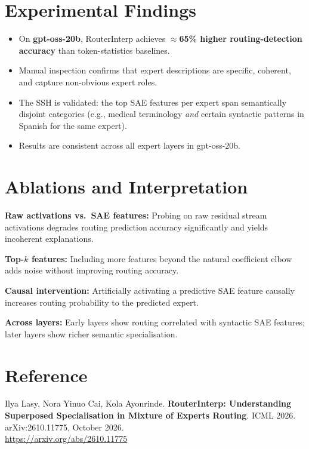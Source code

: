 \documentclass[10pt,twocolumn]{article}
\begin{document}
\section{Experimental Findings}

\begin{itemize}[itemsep=2pt,parsep=0pt]
  \item On \textbf{gpt-oss-20b}, RouterInterp achieves $\approx$\textbf{65\%
    higher routing-detection accuracy} than token-statistics baselines.
  \item Manual inspection confirms that expert descriptions are specific,
    coherent, and capture non-obvious expert roles.
  \item The SSH is validated: the top SAE features per expert span
    semantically disjoint categories (e.g., medical terminology
    \emph{and} certain syntactic patterns in Spanish for the same expert).
  \item Results are consistent across all expert layers in gpt-oss-20b.
\end{itemize}

\section{Ablations and Interpretation}

\textbf{Raw activations vs.\ SAE features:} Probing on raw residual stream
activations degrades routing prediction accuracy significantly and yields
incoherent explanations.

\textbf{Top-$k$ features:} Including more features beyond the natural
coefficient elbow adds noise without improving routing accuracy.

\textbf{Causal intervention:} Artificially activating a predictive SAE feature
causally increases routing probability to the predicted expert.

\textbf{Across layers:} Early layers show routing correlated with syntactic
SAE features; later layers show richer semantic specialisation.

\section*{Reference}

Ilya Lasy, Nora Yinuo Cai, Kola Ayonrinde.
\textbf{RouterInterp: Understanding Superposed Specialisation in Mixture of
Experts Routing}.
ICML 2026. arXiv:2610.11775, October 2026.\\
\url{https://arxiv.org/abs/2610.11775}
\end{document}
